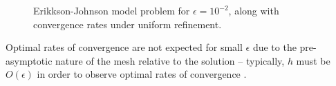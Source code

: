 \documentclass[final,leqno]{siamltex}
\begin{document}
\begin{figure}[!h]
\centering
{}
\caption{Erikkson-Johnson model problem for $\epsilon = 10^{-2}$, along with convergence rates under uniform refinement.}
\label{fig:erikkson}
\end{figure}

Optimal rates of convergence are not expected for small $\epsilon$ due to the pre-asymptotic nature of the mesh relative to the solution -- typically, $h$ must be $O(\epsilon)$ in order to observe optimal rates of convergence \cite{SchwabBoundaryLayers}.  
\end{document}
